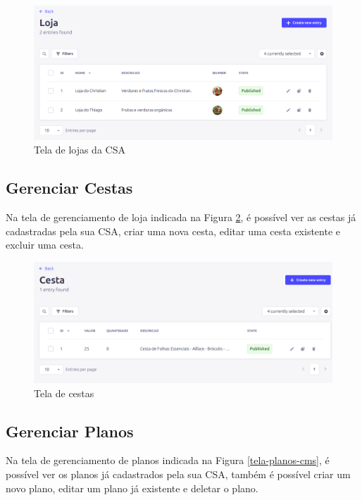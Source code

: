 \begin{figure}[h]
	\centering
	\includegraphics[keepaspectratio=true,scale=0.28]{figuras/painel_lojas.png}
	\caption{Tela de lojas da CSA}
        \label{tela-lojas-cms}
\end{figure}

\subsection{Gerenciar Cestas}
Na tela de gerenciamento de loja indicada na Figura \ref{tela-cestas-cms}, é possível ver as cestas já cadastradas pela sua CSA, criar uma nova cesta, editar uma cesta existente e excluir uma cesta.

\begin{figure}[h]
	\centering
	\includegraphics[keepaspectratio=true,scale=0.28]{figuras/painel_cestas.png}
	\caption{Tela de cestas}
        \label{tela-cestas-cms}
\end{figure}

\subsection{Gerenciar Planos}
Na tela de gerenciamento de planos indicada na Figura \ref{tela-planos-cms}, é possível ver os planos já cadastrados pela sua CSA, também é possível criar um novo plano, editar um plano já existente e deletar o plano.


